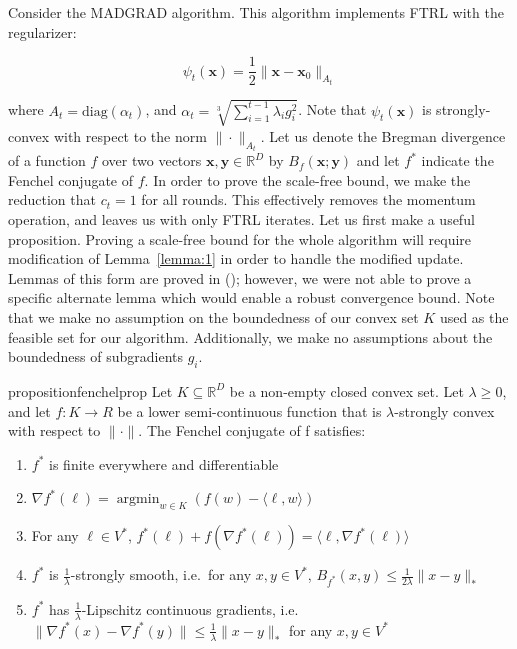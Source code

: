 \documentclass{article}
\newcommand{\R}{\mathbb{R}}
\newcommand{\argmin}{\mathop{\text{argmin}}}
\newcommand{\diag}{\text{diag}}
\newcommand{\bx}{\mathbf{x}}
\newcommand{\by}{\mathbf{y}}
\begin{document}
Consider the MADGRAD algorithm. This algorithm implements FTRL with the regularizer: 

\[
  \psi_t(\bx) = \frac{1}{2} \|\bx - \bx_0 \|_{A_t}
\]

where $A_t = \diag(\alpha_t)$, and $\alpha_t = \sqrt[3]{\sum_{i=1}^{t-1}\lambda_i g_i^2}$. Note that $\psi_t(\bx)$ is
strongly-convex with respect to the norm $\| \cdot \|_{A_t}$. Let us denote the Bregman divergence of a function $f$
over two vectors $\bx, \by \in \R^D$ by $B_f(\bx; \by)$ and let $f^*$ indicate the Fenchel conjugate of $f$. In
order to prove the scale-free bound, we make the reduction that $c_t = 1$ for all rounds. This effectively removes the
momentum operation, and leaves us with only FTRL iterates. Let us first make a useful proposition. Proving a scale-free
bound for the whole algorithm will require modification of Lemma~\ref{lemma:1} in order to handle the modified update.
Lemmas of this form are proved in (\cite{nesterov_quasi-monotone_2015}); however, we were not able to prove a specific
alternate lemma which would enable a robust convergence bound. Note that we make no assumption on the boundedness of our
convex set $K$ used as the feasible set for our algorithm. Additionally, we make no assumptions about the boundedness of
subgradients $g_i$. 

\begin{restatable}{proposition}{fenchelprop}\label{prop:1}
  Let $K \subseteq \R^D$ be a non-empty closed convex set. Let $\lambda \geq 0$, and let $f: K \rightarrow R$ be a lower
  semi-continuous function that is $\lambda$-strongly convex with respect to $\| \cdot \|$. The Fenchel conjugate of f
  satisfies:

  \begin{enumerate}
    \item $f^*$ is finite everywhere and differentiable
    \item $\nabla f^* (\ell) = \argmin_{w \in K}(f(w) - \langle \ell, w \rangle)$
    \item For any $\ell \in V^*$, $f^*(\ell) + f(\nabla f^*(\ell)) = \langle \ell, \nabla f^* (\ell) \rangle$
    \item $f^*$ is $\frac{1}{\lambda}$-strongly smooth, i.e.\ for any $x, y \in V^*$, $B_{f^*}(x, y) \leq
      \frac{1}{2\lambda}\|x - y \|_*$
    \item $f^*$ has $\frac{1}{\lambda}$-Lipschitz continuous gradients, i.e. $\| \nabla f^*(x) - \nabla f^*(y)\| \leq
      \frac{1}{\lambda}\|x - y\|_*$ for any $x, y \in V^*$
  \end{enumerate}
\end{restatable}
\end{document}
